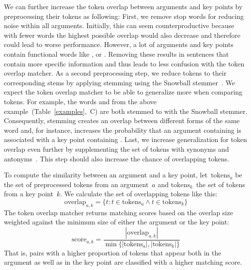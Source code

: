 We can further increase the token overlap between arguments and key points by preprocessing their tokens as following:
First, we remove stop words for reducing noise within all arguments.
Initially, this can seem counterproductive because with fewer words the highest possible overlap would also decrease and 
therefore could lead to worse performance.
However, a lot of arguments and key points contain functional words like ,  or .
Removing these results in sentences that contain more specific information and thus leads to less confusion with the token overlap matcher.
As a second preprocessing step, we reduce tokens to their corresponding stems by applying stemming using the Snowball stemmer~\cite{Porter1980}. 
We expect the token overlap matcher to be able to generalize more when comparing tokens.
For example, the words  and  from the above example~(Table~\ref{examples},~C) 
are both stemmed to  with the Snowball stemmer. 
Consequently, stemming creates an overlap between different forms of the same word and, for instance, increases the 
probability that an argument containing  is associated with a key point containing .
Last, we increase generalization for token overlap even further by supplementing the set of tokens with synonyms and antonyms~\cite{Miller1995}. 
This step should also increase the chance of overlapping tokens.

To compute the similarity between an argument and a key point, let~\(\text{tokens}_a\) be the set of preprocessed tokens from an 
argument~\(a\) and \(\text{tokens}_k\)~the set of tokens from a key point~\(k\).
We calculate the set of overlapping tokens like this:
\begin{equation}
    \text{overlap}_{a,k} = \{ t : t \in \text{tokens}_a \land t \in \text{tokens}_k \}
\end{equation}
The token overlap matcher returns matching scores based on the overlap size weighted against the minimum size of either 
the argument or the key point:
\begin{equation}
    \text{score}_{a,k} = \frac{ |\text{overlap}_{a,k}| }{ \min\{ |\text{tokens}_a|, |\text{tokens}_k| \} }
\end{equation}
That is, pairs with a higher proportion of tokens that appear both in the argument as well as in the key point are 
classified with a higher matching score.

